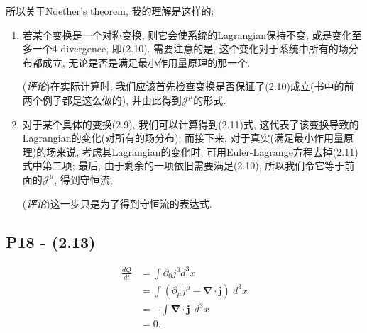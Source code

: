 \documentclass[10pt,b5paper,openany]{book}
\begin{document}
所以关于Noether's theorem, 我的理解是这样的: 

\begin{enumerate}
  \item 若某个变换是一个对称变换, 则它会使系统的Lagrangian保持不变, 或是变化至多一个4-divergence, 即(2.10). 需要注意的是, 这个变化对于系统中所有的场分布都成立, 无论是否是满足最小作用量原理的那一个. 

  (\textit{评论})在实际计算时, 我们应该首先检查变换是否保证了(2.10)成立(书中的前两个例子都是这么做的), 并由此得到$\mathcal{J}^{\mu}$的形式. 
  \item 对于某个具体的变换(2.9), 我们可以计算得到(2.11)式, 这代表了该变换导致的Lagrangian的变化(对所有的场分布); 而接下来, 对于真实(满足最小作用量原理)的场来说, 考虑其Lagrangian的变化时, 可用Euler-Lagrange方程去掉(2.11)式中第二项; 最后, 由于剩余的一项依旧需要满足(2.10), 所以我们令它等于前面的$\mathcal{J}^{\mu}$, 得到守恒流. 

  (\textit{评论})这一步只是为了得到守恒流的表达式. 
\end{enumerate}

\begin{center}
\end{center}

\subsection{P18 - (2.13)}
\begin{equation}
  \begin{aligned}
  \frac{dQ}{dt} &= \int \partial_0 j^0 d^3 x \\
  &= \int (\partial_\mu j^\mu - \boldsymbol{\nabla}\cdot\mathbf{j}) \ d^3 x \\
  & = - \int \boldsymbol{\nabla}\cdot\mathbf{j}\ \ d^3 x \\
  &=0.
  \end{aligned}
\end{equation}
\end{document}
